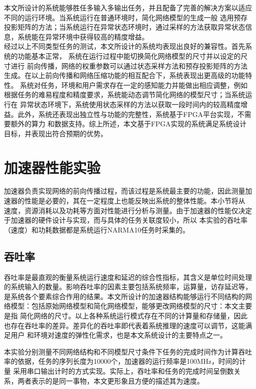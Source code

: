 本文所设计的系统能够胜任多输入多输出任务，并且配备了完善的解决方案以适应不同的运行环境。当系统运行在普通环境时，简化网络模型的生成一般
选用预存投影矩阵的方法；当系统运行在异常状态环境时，通过采样的方法获取异常状态信息，系统能在异常环境中获得较高的精度增益。%
\\

经过以上不同类型任务的测试，本文所设计的系统均表现出良好的兼容性。首先系统的功能基本正常， 系统在运行过程中能切换简化网络模型的尺寸并以设定的尺寸进行
前向传播，网络的权重参数可以通过状态采样方法和预存投影矩阵的方法生成。在以上前向传播和网络压缩功能的相互配合下，系统表现出更高级的功能特性。
系统对任务，环境和用户需求存在一定的感知能力并能做出相应调整，例如根据任务的难易程度和精度要求，系统能动态调节简化网络的模型尺寸；当系统运行在
异常状态环境下，系统使用状态采样的方法以获取一段时间内的较高精度增益。此外，系统还表现出独立性与功能的完整性，系统基于FPGA平台实现，不需要额外的算力
和数据支持。综上所述，本文基于FPGA实现的系统满足系统设计目标，并表现出符合预期的优势。




\section{加速器性能实验}

加速器负责实现网络的前向传播过程，而该过程是系统最主要的功能，因此测量加速器的性能是必要的，其在一定程度上也能反映出系统的整体性能。本小节将从
速度，资源消耗以及功耗等方面对性能进行分析与测量。由于加速器的性能仅决定于加速器的硬件设计与实现，而与具体的任务关联度较小，所以
本实验的吞吐率（速度）和功耗数据都是系统运行NARMA10任务时采集的。
\subsection{吞吐率}
吞吐率是最直观的衡量系统运行速度和延迟的综合性指标，其含义是单位时间处理的系统输入的数量。影响吞吐率的因素主要包括系统频率，运算量，访存延迟等，
是系统各个要素综合作用的结果。本文所设计的加速器结构能够运行不同结构的网络模型：包括原始网络模型和简化网络模型，能够更改网络模型的尺寸：本文主要是指
简化网络的尺寸。以上各种系统运行模式存在不同的计算量和存储量，因此也存在吞吐率的差异。差异化的吞吐率即代表着系统推理的速度可以调节，这能满足用户
和环境对速度的弹性化需求，也是本文系统设计的主要特点之一。

本实验分别测量不同网络结构和不同模型尺寸条件下任务的完成时间作为计算吞吐率的依据，任务的序列长度为10000个，加速器的运行频率是100MHz，时间的计量
采用串口输出计时的方式实现。实际上，吞吐率和任务的完成时间呈倒数关系，两者表示的是同一事物，本文更形象且方便的描述其为速度。

